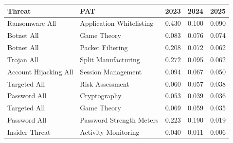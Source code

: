 \begin{tabular}{llrrr}
\toprule
Threat & PAT & 2023 & 2024 & 2025 \\
\midrule
Ransomware All & Application Whitelisting & 0.430 & 0.100 & 0.090 \\
Botnet All & Game Theory & 0.083 & 0.076 & 0.074 \\
Botnet All & Packet Filtering & 0.208 & 0.072 & 0.062 \\
Trojan All & Split Manufacturing & 0.272 & 0.095 & 0.062 \\
Account Hijacking All & Session Management & 0.094 & 0.067 & 0.050 \\
Targeted  All & Risk Assessment & 0.060 & 0.057 & 0.038 \\
Password  All & Cryptography & 0.053 & 0.039 & 0.036 \\
Targeted  All & Game Theory & 0.069 & 0.059 & 0.035 \\
Password  All & Password Strength Meters & 0.223 & 0.190 & 0.019 \\
Insider Threat & Activity Monitoring & 0.040 & 0.011 & 0.006 \\
\bottomrule
\end{tabular}
